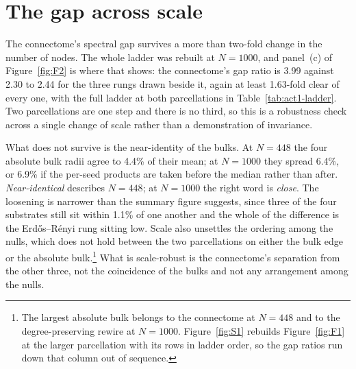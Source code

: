 

\section{The gap across scale}
\label{sec:act1-scale}
\bigskip

The connectome's spectral gap survives a more than two-fold
change in the number of nodes. The whole ladder was rebuilt at
$N = 1000$, %
and panel~(c) of Figure~\ref{fig:F2} is where that shows: the connectome's gap
ratio is 3.99 %
against 2.30 to 2.44 %
for the three rungs drawn beside it, again at least
1.63-fold %
clear of every one, with the full ladder at both parcellations in
Table~\ref{tab:act1-ladder}.
Two parcellations are one step and there is no third, so
this is a robustness check across a single change of scale rather than a
demonstration of invariance.

What does not survive is the near-identity of the bulks. At $N = 448$ the four
absolute bulk radii agree to 4.4\% %
of their mean; at $N = 1000$ they spread 6.4\%, %
or 6.9\% %
if the per-seed products are taken before the median rather than after.
\emph{Near-identical} describes $N = 448$; at $N = 1000$ the right word is
\emph{close}. The loosening is narrower than the summary figure suggests, since
three of the four substrates still sit within
1.1\% %
of one another and the whole of the difference is the Erdős–Rényi rung sitting
low. Scale also unsettles the ordering among the nulls, which does not hold
between the two parcellations on either the bulk edge or the absolute
bulk.\footnote{The largest absolute bulk belongs to the connectome at
$N = 448$ and to the degree-preserving rewire at
$N = 1000$. %
Figure~\ref{fig:S1} rebuilds Figure~\ref{fig:F1} at the larger parcellation with
its rows in ladder order, so the gap ratios run down that column out of
sequence.} What is scale-robust is the connectome's separation from the other
three, not the coincidence of the bulks and not any arrangement among the nulls.


